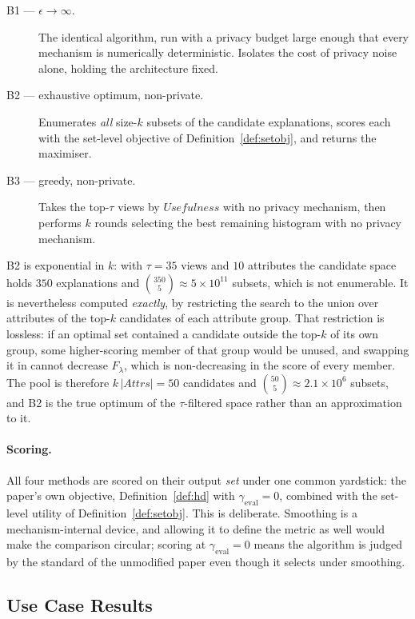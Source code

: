 \begin{description}
  \item[B1 --- $\epsilon\rightarrow\infty$.] The identical algorithm, run with a privacy budget large enough that every mechanism is numerically deterministic. Isolates the cost of privacy noise alone, holding the architecture fixed.
  \item[B2 --- exhaustive optimum, non-private.] Enumerates \emph{all} size-$k$ subsets of the candidate explanations, scores each with the set-level objective of Definition~\ref{def:setobj}, and returns the maximiser.
  \item[B3 --- greedy, non-private.] Takes the top-$\tau$ views by $Usefulness$ with no privacy mechanism, then performs $k$ rounds selecting the best remaining histogram with no privacy mechanism.
\end{description}

B2 is exponential in $k$: with $\tau=35$ views and $10$ attributes the candidate space holds $350$ explanations and $\binom{350}{5}\approx5\times10^{11}$ subsets, which is not enumerable.
It is nevertheless computed \emph{exactly}, by restricting the search to the union over attributes of the top-$k$ candidates of each attribute group.
That restriction is lossless: if an optimal set contained a candidate outside the top-$k$ of its own group, some higher-scoring member of that group would be unused, and swapping it in cannot decrease $F_\lambda$, which is non-decreasing in the score of every member.
The pool is therefore $k\,|Attrs|=50$ candidates and $\binom{50}{5}\approx2.1\times10^{6}$ subsets, and B2 is the true optimum of the $\tau$-filtered space rather than an approximation to it.

\paragraph{Scoring.}
All four methods are scored on their output \emph{set} under one common yardstick: the paper's own objective, Definition~\ref{def:hd} with $\gamma_{\text{eval}}=0$, combined with the set-level utility of Definition~\ref{def:setobj}.
This is deliberate. Smoothing is a mechanism-internal device, and allowing it to define the metric as well would make the comparison circular; scoring at $\gamma_{\text{eval}}=0$ means the algorithm is judged by the standard of the unmodified paper even though it selects under smoothing.

\subsection{Use Case Results}
\label{sec:usecase-results}

